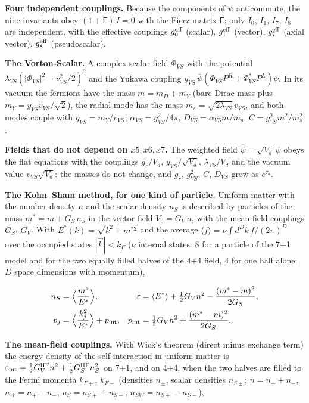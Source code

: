 \documentclass[
  10pt,
]{article}
\begin{document}
\textbf{Four independent couplings.} Because the components of \(\psi\)
anticommute, the nine invariants obey \((1+\mathsf F)\,I=0\) with the
Fierz matrix \(\mathsf F\); only \(I_0\), \(I_1\), \(I_7\), \(I_8\) are
independent, with the effective couplings \(g_0^{\rm eff}\) (scalar),
\(g_1^{\rm eff}\) (vector), \(g_7^{\rm eff}\) (axial vector),
\(g_8^{\rm eff}\) (pseudoscalar).

\textbf{The Vorton-Scalar.} A complex scalar field \(\Phi_{VS}\) with
the potential \(\lambda_{VS}(|\Phi_{VS}|^2-v_{VS}^2/2)^2\) and the
Yukawa coupling \(y_{VS}\,\bar\psi(\Phi_{VS}P^R+\Phi_{VS}^*P^L)\psi\).
In its vacuum the fermions have the mass \(m=m_D+m_Y\) (bare Dirac mass
plus \(m_Y=y_{VS}v_{VS}/\sqrt2\)), the radial mode has the mass
\(m_s=\sqrt{2\lambda_{VS}}\,v_{VS}\), and both modes couple with
\(g_{VS}=m_Y/v_{VS}\); \(\alpha_{VS}=g_{VS}^2/4\pi\),
\(D_{VS}=\alpha_{VS}m/m_s\), \(C=g_{VS}^2m^2/m_s^2\).

\textbf{Fields that do not depend on \(x5,x6,x7\).} The weighted field
\(\hat\psi=\sqrt{V_d}\,\psi\) obeys the flat equations with the
couplings \(g_r/V_d\), \(y_{VS}/\sqrt{V_d}\), \(\lambda_{VS}/V_d\) and
the vacuum value \(v_{VS}\sqrt{V_d}\): the masses do not change, and
\(g_r\), \(g_{VS}^2\), \(C\), \(D_{VS}\) grow as \(e^{\tau_d}\).

\textbf{The Kohn--Sham method, for one kind of particle.} Uniform matter
with the number density \(n\) and the scalar density \(n_S\) is
described by particles of the mass \(m^*=m+G_S\,n_S\) in the vector
field \(V_0=G_V\,n\), with the mean-field couplings \(G_S\), \(G_V\).
With \(E^*(k)=\sqrt{k^2+m^{*2}}\) and the average
\(\langle f\rangle=\nu\int d^Dk\,f/(2\pi)^D\) over the occupied states
\(|\vec k|<k_F\) (\(\nu\) internal states: 8 for a particle of the 7+1
model and for the two equally filled halves of the 4+4 field, 4 for one
half alone; \(D\) space dimensions with momentum),

\[\begin{aligned}
n_S&=\Big\langle\frac{m^*}{E^*}\Big\rangle,&
\varepsilon&=\langle E^*\rangle+\tfrac12G_Vn^2-\frac{(m^*-m)^2}{2G_S},\\
p_j&=\Big\langle\frac{k_j^2}{E^*}\Big\rangle+p_{\rm int},&
p_{\rm int}&=\tfrac12G_Vn^2+\frac{(m^*-m)^2}{2G_S}.
\end{aligned}\]

\textbf{The mean-field couplings.} With Wick's theorem (direct minus
exchange term) the energy density of the self-interaction in uniform
matter is
\(\varepsilon_{\rm int}=\tfrac12G_V^{\rm HF}n^2+\tfrac12G_S^{\rm HF}n_S^2\)
on 7+1, and on 4+4, when the two halves are filled to the Fermi momenta
\(k_{F+}\), \(k_{F-}\) (densities \(n_\pm\), scalar densities
\(n_{S\pm}\); \(n=n_++n_-\), \(n_W=n_+-n_-\), \(n_S=n_{S+}+n_{S-}\),
\(n_{SW}=n_{S+}-n_{S-}\)),
\end{document}

